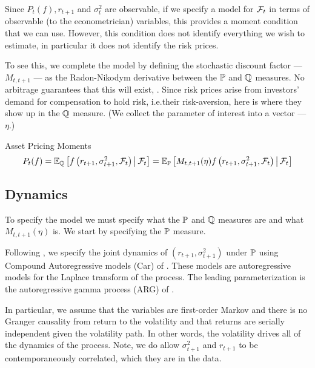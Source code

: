 \documentclass[11pt, letterpaper, twoside, final]{article}
\begin{document}
Since $P_t(f), r_{t+1}$ and $\sigma_t^2$ are observable, if we specify a model for $\mathcal{F}_t$ in terms of observable
(to the econometrician) variables, this provides a moment condition that we can use. 
However, this condition does not identify everything we wish to estimate, in particular it does not identify the
risk prices. 


To see this, we complete the model by defining the stochastic discount factor --- $M_{t, t+1}$ --- as the
Radon-Nikodym derivative between the $\mathbb{P}$ and $\mathbb{Q}$ measures. 
No arbitrage guarantees that this will exist, \parencite{harrison1978martingales}.
Since risk prices arise from investors' demand for compensation to hold risk, i.e.\@ their risk-aversion, here is
where they show up in the $\mathbb{Q}$ measure. 
(We collect the parameter of interest into a vector --- $\eta$.)


\begin{defn}{Asset Pricing Moments}
    \begin{equation}
        P_t(f)  = \operatorname{\mathbb{E}}_{\mathbb{Q}} \left[f\left(r_{t+1}, \sigma^2_{t+1} , \mathcal{F}_t\right) \,\middle\vert\, \mathcal{F}_t \right] =
        \operatorname{\mathbb{E}}_{\mathbb{P}}\left[M_{t,t+1}(\eta)f\left(r_{t+1}, \sigma^2_{t+1}, \mathcal{F}_t\right) \,\middle\vert\, \mathcal{F}_t \right] 
    \end{equation}
\end{defn}

\subsection{Dynamics}\label{sec:dynamics}

To specify the model we must specify what the $\mathbb{P}$ and $\mathbb{Q}$ measures are and what $M_{t, t+1}(\eta)$ is.
We start by specifying the $\mathbb{P}$ measure.

Following \textcite{khrapov2016affine}, we specify the joint dynamics of $\left(r_{t+1}, \sigma^2_{t+1}\right)$
under $\mathbb{P}$ using Compound Autoregressive models (Car) of \textcite{darolles2006structural}.
These models are autoregressive models for the Laplace transform of the process.
The leading parameterization is the autoregressive gamma process (ARG) of \textcite{gourieroux2006autoregressive}.

In particular, we assume that the variables are first-order Markov and there is no Granger causality from return
to the volatility and that returns are serially independent given the volatility path.
In other words, the volatility drives all of the dynamics of the process.
Note, we do allow $\sigma^2_{t+1}$ and $r_{t+1}$ to be contemporaneously correlated, which they are in the data. 
\end{document}
